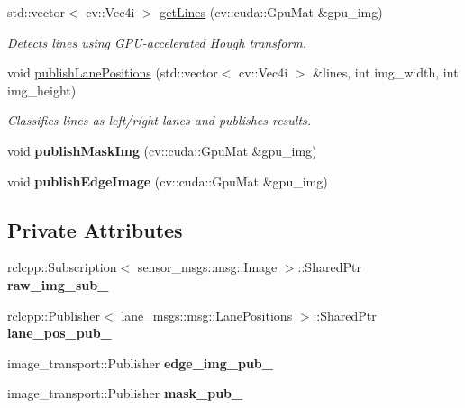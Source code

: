 \begin{DoxyCompactItemize}
std\+::vector$<$ cv\+::\+Vec4i $>$ \hyperlink{classVisionNode_adf0f075a5d4706a887ba3198799a836f}{get\+Lines} (cv\+::cuda\+::\+Gpu\+Mat \&gpu\+\_\+img)
\begin{DoxyCompactList}\small\item\em Detects lines using G\+P\+U-\/accelerated Hough transform. \end{DoxyCompactList}\item 
void \hyperlink{classVisionNode_a4d826b83d642f5033c796a8f89cd2b58}{publish\+Lane\+Positions} (std\+::vector$<$ cv\+::\+Vec4i $>$ \&lines, int img\+\_\+width, int img\+\_\+height)
\begin{DoxyCompactList}\small\item\em Classifies lines as left/right lanes and publishes results. \end{DoxyCompactList}\item 
\mbox{\label{classVisionNode_afa493f144507b0de569a5935a54661f1}} 
void {\bfseries publish\+Mask\+Img} (cv\+::cuda\+::\+Gpu\+Mat \&gpu\+\_\+img)
\item 
\mbox{\label{classVisionNode_ac7f9f0b9c0c06f4446627de8d93dcd05}} 
void {\bfseries publish\+Edge\+Image} (cv\+::cuda\+::\+Gpu\+Mat \&gpu\+\_\+img)
\end{DoxyCompactItemize}
\subsection*{Private Attributes}
\begin{DoxyCompactItemize}
\item 
\mbox{\label{classVisionNode_a7f2f6a8fc2898ec230d96a6df386f0ae}} 
rclcpp\+::\+Subscription$<$ sensor\+\_\+msgs\+::msg\+::\+Image $>$\+::Shared\+Ptr {\bfseries raw\+\_\+img\+\_\+sub\+\_\+}
\item 
\mbox{\label{classVisionNode_aa4563584d251d6a0d2a3442a083ba8f0}} 
rclcpp\+::\+Publisher$<$ lane\+\_\+msgs\+::msg\+::\+Lane\+Positions $>$\+::Shared\+Ptr {\bfseries lane\+\_\+pos\+\_\+pub\+\_\+}
\item 
\mbox{\label{classVisionNode_ab716281a28831e4e643d9ac14275a5d3}} 
image\+\_\+transport\+::\+Publisher {\bfseries edge\+\_\+img\+\_\+pub\+\_\+}
\item 
\mbox{\label{classVisionNode_a6ab1e698ad581462c57aa056ac3fd245}} 
image\+\_\+transport\+::\+Publisher {\bfseries mask\+\_\+pub\+\_\+}
\end{DoxyCompactItemize}


